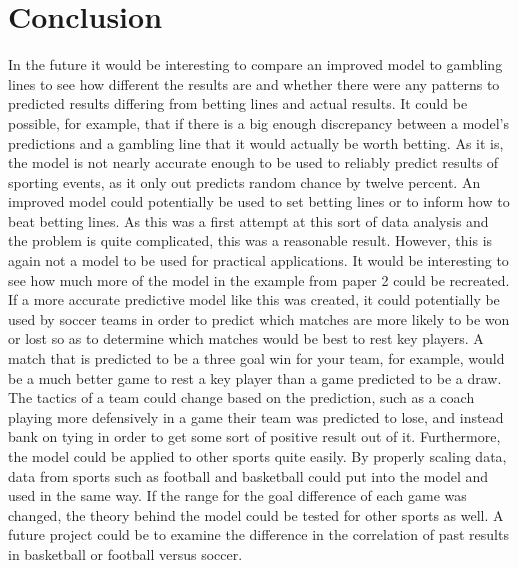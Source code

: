 \documentclass[sigconf]{acmart}
\begin{document}
\section{Conclusion}
In the future it would be interesting to compare an improved model to gambling lines to see how different the results are and whether there were any patterns to predicted results differing from betting lines and actual results. It could be possible, for example, that if there is a big enough discrepancy between a model's predictions and a gambling line that it would actually be worth betting. As it is, the model is not nearly accurate enough to be used to reliably predict results of sporting events, as it only out predicts random chance by twelve percent. An improved model could potentially be used to set betting lines or to inform how to beat betting lines. As this was a first attempt at this sort of data analysis and the problem is quite complicated, this was a reasonable result. However, this is again not a model to be used for practical applications. It would be interesting to see how much more of the model in the example from paper 2 could be recreated. If a more accurate predictive model like this was created, it could potentially be used by soccer teams in order to predict which matches are more likely to be won or lost so as to determine which matches would be best to rest key players. A match that is predicted to be a three goal win for your team, for example, would be a much better game to rest a key player than a game predicted to be a draw. The tactics of a team could change based on the prediction, such as a coach playing more defensively in a game their team was predicted to lose, and instead bank on tying in order to get some sort of positive result out of it. Furthermore, the model could be applied to other sports quite easily. By properly scaling data, data from sports such as football and basketball could put into the model and used in the same way. If the range for the goal difference of each game was changed, the theory behind the model could be tested for other sports as well. A future project could be to examine the difference in the correlation of past results in basketball or football versus soccer.
\end{document}
